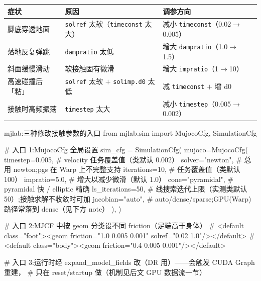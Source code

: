 \begin{center}
\small
\begin{tabular}{@{}lll@{}}
\toprule
症状 & 原因 & 调参方向 \\
\midrule
脚底穿透地面 & \verb|solref| 太软（\verb|timeconst| 太大） & 减小 \verb|timeconst|（0.02$\to$0.005） \\
落地反复弹跳 & \verb|dampratio| 太低 & 增大 \verb|dampratio|（1.0$\to$1.5） \\
斜面缓慢滑动 & 软接触固有微滑 & 增大 \verb|impratio|（1$\to$10） \\
高速碰撞后「粘」 & \verb|solref| 太软 $+$ \verb|solimp.d0| 太低 & 减 \verb|timeconst| $+$ 增 d0 \\
接触时高频振荡 & \verb|timestep| 太大 & 减小 \verb|timestep|（0.005$\to$0.002） \\
\bottomrule
\end{tabular}
\end{center}

\begin{codebox}[Python]{mjlab:三种修改接触参数的入口}
from mjlab.sim import MujocoCfg, SimulationCfg

# 入口 1:MujocoCfg 全局设置
sim_cfg = SimulationCfg(
    mujoco=MujocoCfg(
        timestep=0.005,      # velocity 任务覆盖值（类默认 0.002）
        solver="newton",     # 总用 newton;pgs 在 Warp 上不完整支持
        iterations=10,       # 任务覆盖值（类默认 100）
        impratio=5.0,        # 增大以减少微滑（默认 1.0）
        cone="pyramidal",    # pyramidal 快 / elliptic 精确
        ls_iterations=50,    # 线搜索迭代上限（实测类默认 50）;接触求解不收敛时可加
        jacobian="auto",     # auto/dense/sparse;GPU(Warp) 路径常落到 dense（见下方 note）
    ),
)

# 入口 2:MJCF 中按 geom 分类设不同 friction（足端高于身体）
#   <default class="foot"><geom friction="1.0 0.005 0.001" solref="0.02 1.0"/></default>
#   <default class="body"><geom friction="0.4 0.005 0.001"/></default>

# 入口 3:运行时经 expand_model_fields 改（DR 用）——会触发 CUDA Graph 重建，
#   只在 reset/startup 做（机制见后文 GPU 数据流一节）
\end{codebox}


